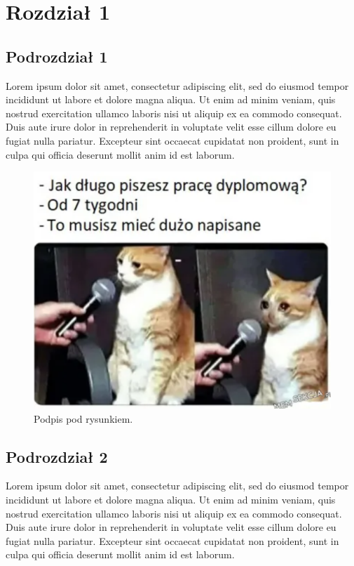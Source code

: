 \chapter{Rozdział 1}
\label{cha:rozdzial1}

\section{Podrozdział 1}
\label{sec:podrozdzial1}
Lorem ipsum dolor sit amet, consectetur adipiscing elit, sed do eiusmod tempor incididunt ut labore et dolore magna aliqua. Ut enim ad minim veniam, quis nostrud exercitation ullamco laboris nisi ut aliquip ex ea commodo consequat. Duis aute irure dolor in reprehenderit in voluptate velit esse cillum dolore eu fugiat nulla pariatur. Excepteur sint occaecat cupidatat non proident, sunt in culpa qui officia deserunt mollit anim id est laborum. \cite{stats_adoption}

\begin{center}
\begin{figure}[ht]
  \includegraphics[width=6in]{img/plik.png}
  \caption{Podpis pod rysunkiem\cite{nature_behavior}.}
  \label{Figure:fig_beh}
\end{figure}
\end{center}


\section{Podrozdział 2}
\label{sec:podrozdzial2}
Lorem ipsum dolor sit amet, consectetur adipiscing elit, sed do eiusmod tempor incididunt ut labore et dolore magna aliqua. Ut enim ad minim veniam, quis nostrud exercitation ullamco laboris nisi ut aliquip ex ea commodo consequat. Duis aute irure dolor in reprehenderit in voluptate velit esse cillum dolore eu fugiat nulla pariatur. Excepteur sint occaecat cupidatat non proident, sunt in culpa qui officia deserunt mollit anim id est laborum. \cite{norman2013design}